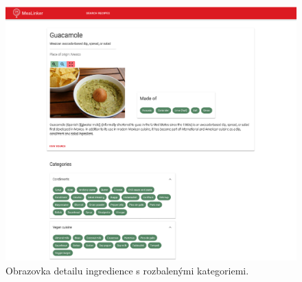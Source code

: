 \begin{figure}[h!]\centering
\includegraphics[width=140mm]{../img/ingredient-categories}
\caption{Obrazovka detailu ingredience s rozbalenými kategoriemi.}
\label{obr05:ingredient-categories}
\end{figure}